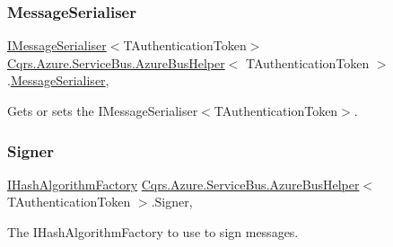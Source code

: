 \subsubsection{\texorpdfstring{Message\+Serialiser}{MessageSerialiser}}
{\footnotesize\ttfamily \hyperlink{interfaceCqrs_1_1Azure_1_1ServiceBus_1_1IMessageSerialiser}{I\+Message\+Serialiser}$<$T\+Authentication\+Token$>$ \hyperlink{classCqrs_1_1Azure_1_1ServiceBus_1_1AzureBusHelper}{Cqrs.\+Azure.\+Service\+Bus.\+Azure\+Bus\+Helper}$<$ T\+Authentication\+Token $>$.\hyperlink{classCqrs_1_1Azure_1_1ServiceBus_1_1MessageSerialiser}{Message\+Serialiser}\hspace{0.3cm}{\ttfamily [get]}, {\ttfamily [protected]}}



Gets or sets the I\+Message\+Serialiser$<$\+T\+Authentication\+Token$>$. 

\mbox{\label{classCqrs_1_1Azure_1_1ServiceBus_1_1AzureBusHelper_ab7901a2e7cdeb4010126506a6c301d00_ab7901a2e7cdeb4010126506a6c301d00}} 
\subsubsection{\texorpdfstring{Signer}{Signer}}
{\footnotesize\ttfamily \hyperlink{interfaceCqrs_1_1Bus_1_1IHashAlgorithmFactory}{I\+Hash\+Algorithm\+Factory} \hyperlink{classCqrs_1_1Azure_1_1ServiceBus_1_1AzureBusHelper}{Cqrs.\+Azure.\+Service\+Bus.\+Azure\+Bus\+Helper}$<$ T\+Authentication\+Token $>$.Signer\hspace{0.3cm}{\ttfamily [get]}, {\ttfamily [protected]}}



The I\+Hash\+Algorithm\+Factory to use to sign messages. 

